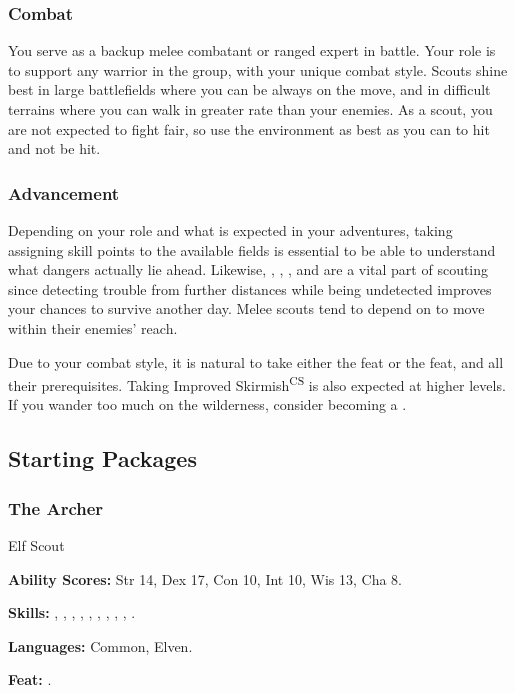 \subsubsection{Combat}
You serve as a backup melee combatant or ranged expert in battle. Your role is to support any warrior in the group, with your unique combat style. Scouts shine best in large battlefields where you can be always on the move, and in difficult terrains where you can walk in greater rate than your enemies. As a scout, you are not expected to fight fair, so use the environment as best as you can to hit and not be hit.

\subsubsection{Advancement}
Depending on your role and what is expected in your adventures, taking assigning skill points to the available  fields is essential to be able to understand what dangers actually lie ahead. Likewise, , , , and  are a vital part of scouting since detecting trouble from further distances while being undetected improves your chances to survive another day. Melee scouts tend to depend on  to move within their enemies' reach.

Due to your combat style, it is natural to take either the  feat or the  feat, and all their prerequisites. Taking Improved Skirmish\textsuperscript{CS} is also expected at higher levels. If you wander too much on the wilderness, consider becoming a .

\subsection{Starting Packages}
\subsubsection{The Archer}
Elf Scout

\textbf{Ability Scores:} Str 14, Dex 17, Con 10, Int 10, Wis 13, Cha 8.

\textbf{Skills:} , , , , , , , , , .

\textbf{Languages:} Common, Elven.

\textbf{Feat:} .

